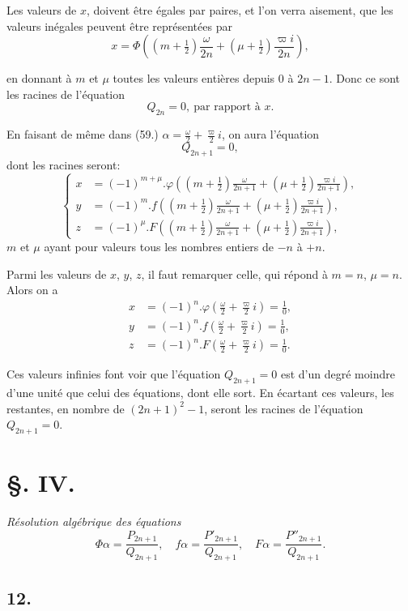 \documentclass{article}
\begin{document}
Les valeurs de $x$, doivent être égales par paires, et l'on verra aisement, que les valeurs inégales peuvent être représentées par
\[ x=\Phi\left((m+\tfrac{1}{2})\frac{\omega}{2n}+(\mu+\tfrac{1}{2})\frac{\varpi i}{2n}\right), \tag{65.} \]

en donnant à $m$ et $\mu$ toutes les valeurs entières depuis 0 à $2n-1$. Donc ce sont les racines de l'équation
\[ Q_{2n}=0,\ \text{par rapport à } x. \]

En faisant de même dans (59.) $\alpha=\frac{\omega}{2}+\frac{\varpi}{2}i$, on aura l'équation
\[ Q_{2n+1}=0, \]
dont les racines seront:
\[ \left\{\begin{aligned}
x&=(-1)^{m+\mu}.\varphi\left((m+\tfrac{1}{2})\frac{\omega}{2n+1}+(\mu+\tfrac{1}{2})\frac{\varpi i}{2n+1}\right),\\
y&=(-1)^{m}.f\left((m+\tfrac{1}{2})\frac{\omega}{2n+1}+(\mu+\tfrac{1}{2})\frac{\varpi i}{2n+1}\right),\\
z&=(-1)^{\mu}.F\left((m+\tfrac{1}{2})\frac{\omega}{2n+1}+(\mu+\tfrac{1}{2})\frac{\varpi i}{2n+1}\right),
\end{aligned}\right. \tag{66.} \]
$m$ et $\mu$ ayant pour valeurs tous les nombres entiers de $-n$ à $+n$.

Parmi les valeurs de $x$, $y$, $z$, il faut remarquer celle, qui répond à $m=n$, $\mu=n$. Alors on a
\[ \begin{aligned}
x&=(-1)^{n}.\varphi\left(\frac{\omega}{2}+\frac{\varpi}{2}i\right)=\frac{1}{0},\\
y&=(-1)^{n}.f\left(\frac{\omega}{2}+\frac{\varpi}{2}i\right)=\frac{1}{0},\\
z&=(-1)^{n}.F\left(\frac{\omega}{2}+\frac{\varpi}{2}i\right)=\frac{1}{0}.
\end{aligned} \]

Ces valeurs infinies font voir que l'équation $Q_{2n+1}=0$ est d'un degré moindre d'une unité que celui des équations, dont elle sort. En écartant ces valeurs, les restantes, en nombre de $(2n+1)^{2}-1$, seront les racines de l'équation $Q_{2n+1}=0$.

\section*{§. IV.}

\emph{Résolution algébrique des équations}
\[ \Phi\alpha=\frac{P_{2n+1}}{Q_{2n+1}},\quad f\alpha=\frac{P'_{2n+1}}{Q_{2n+1}},\quad F\alpha=\frac{P''_{2n+1}}{Q_{2n+1}}. \]

\subsection*{12.}
\end{document}
